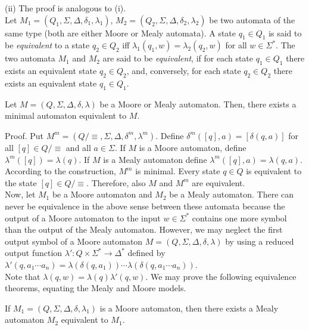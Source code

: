 (ii) The proof is analogous to (i). \\


Let $M_1=(Q_1,\Sigma,\Delta,\delta_1,\lambda_1)$,
$M_2=(Q_2,\Sigma,\Delta,\delta_2,\lambda_2)$ be two automata of the
same type (both are either Moore or Mealy automata).
A state $q_1 \in Q_1$ is said to be {\em equivalent} to
a state $q_2 \in Q_2$ iff $\lambda_1(q_1,w) = \lambda_2(q_2,w)$
for all $w \in \Sigma^*$.
The two automata $M_1$ and $M_2$ are said to be {\em equivalent},
if for each state $q_1 \in Q_1$ there exists an equivalent state $q_2 \in Q_2$,
and, conversely, for each state $q_2 \in Q_2$ there exists an equivalent state
$q_1 \in Q_1$.

\begin{theorem}
Let $M = (Q, \Sigma, \Delta ,\delta, \lambda)$ be a Moore or
Mealy automaton.
Then, there exists a minimal automaton equivalent to $M$.
\end{theorem}

Proof.
Put $M^m = (Q/\equiv, \Sigma, \Delta, \delta^m, \lambda^m)$.
Define $\delta^m([q],a) = [\delta(q,a)]$ for all
$[q] \in Q/\equiv$ and all $a \in \Sigma$.
If $M$ is a Moore automaton, define
$\lambda^m([q]) = \lambda(q)$.
If $M$ is a Mealy automaton define
$\lambda^m([q],a) = \lambda(q,a)$.
According to the construction, $M^m$ is minimal.
Every state $q \in Q$ is equivalent
to the state $[q] \in Q/\equiv$.
Therefore, also $M$ and $M^m$ are equivalent.\\

Now, let $M_1$ be a Moore automaton and $M_2$ be a Mealy automaton.
There can never be equivalence in the above sense between
these automata because the output of a Moore automaton to the input
$w \in \Sigma^*$ contains one more symbol than the output of the
Mealy automaton.
However, we may neglect the first output symbol of a Moore automaton
$M=(Q,\Sigma,\Delta,\delta,\lambda)$
by using a reduced output function
$\lambda':Q\times \Sigma^* \rightarrow \Delta^*$
defined by \\
$\lambda'(q,a_1 \cdots a_n) = \lambda(\delta(q,a_1)) \cdots
\lambda(\delta(q,a_1 \cdots a_n))$. \\
Note that $\lambda(q,w) = \lambda(q)\lambda'(q,w)$.
We may prove the following equivalence theorems, equating the
Mealy and Moore models.

\begin{theorem}
If $M_1=(Q,\Sigma,\Delta,\delta,\lambda_1)$ is a Moore automaton, then there
exists a Mealy automaton $M_2$ equivalent to $M_1$.
\end{theorem}

